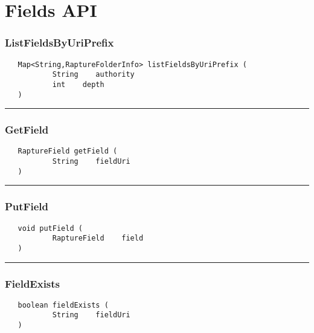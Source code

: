 \chapter{Fields API}

\subsection{ListFieldsByUriPrefix}
\label{Api:ListFieldsByUriPrefix}
\begin{verbatim}
   Map<String,RaptureFolderInfo> listFieldsByUriPrefix (
           String    authority
           int    depth
   )
\end{verbatim}



\rule{15cm}{2pt}
\subsection{GetField}
\label{Api:GetField}
\begin{verbatim}
   RaptureField getField (
           String    fieldUri
   )
\end{verbatim}



\rule{15cm}{2pt}
\subsection{PutField}
\label{Api:PutField}
\begin{verbatim}
   void putField (
           RaptureField    field
   )
\end{verbatim}



\rule{15cm}{2pt}
\subsection{FieldExists}
\label{Api:FieldExists}
\begin{verbatim}
   boolean fieldExists (
           String    fieldUri
   )
\end{verbatim}



